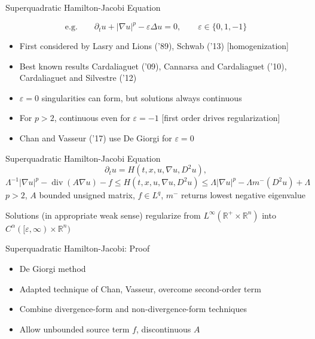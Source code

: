 \documentclass{beamer}
\newcommand{\R}{\mathbb{R}}
\newcommand{\eps}{\varepsilon}
\newcommand{\paren}[1]{\left( #1 \right)}
\newcommand{\del}{\partial}
\newcommand{\grad}{\nabla}
\renewcommand{\div}{\operatorname{div}}
\newcommand{\Laplace}{\Delta}
\newcommand{\n}{^{-1}}
\begin{document}

\begin{frame}{Superquadratic Hamilton-Jacobi Equation}
\pause

\[\textrm{e.g.} \qquad \del_t u + |\grad u|^p - \eps \Laplace u = 0, \qquad \eps \in \{0,1,-1\} \]

\begin{itemize}
\item First considered by Lasry and Lions ('89), Schwab ('13) [homogenization]
\item Best known results Cardaliaguet ('09), Cannarsa and Cardaliaguet ('10), Cardaliaguet and Silvestre ('12)
\item $\eps = 0$ singularities can form, but solutions always continuous
\item For $p > 2$, continuous even for $\eps = -1$ [first order drives regularization]
\item Chan and Vasseur ('17) use De Giorgi for $\eps = 0$
\end{itemize}

\end{frame}


\begin{frame}{Superquadratic Hamilton-Jacobi Equation}
\[ \del_t u = H\paren{t,x,u,\grad u, D^2 u}, \]
\[ \Lambda\n |\grad u|^p - \div\paren{A \grad u} - f \leq H\paren{t,x,u,\grad u, D^2 u} \leq \Lambda |\grad u|^p - \Lambda m^-(D^2 u) + \Lambda \]
$p > 2$, $A$ bounded unsigned matrix, $f \in L^q$, $m^-$ returns lowest negative eigenvalue

\begin{theorem}[S., Vasseur [CMS, '18{]}]
Solutions (in appropriate weak sense) regularize from $L^\infty(\R^+\times\R^n)$ into $C^\alpha([\eps,\infty)\times \R^n)$
\end{theorem}
\end{frame}


\begin{frame}{Superquadratic Hamilton-Jacobi: Proof}
\begin{itemize}
\item De Giorgi method
\item Adapted technique of Chan, Vasseur, overcome second-order term
\item Combine divergence-form and non-divergence-form techniques
\item Allow unbounded source term $f$, discontinuous $A$
\end{itemize}
\end{frame}
\end{document}
